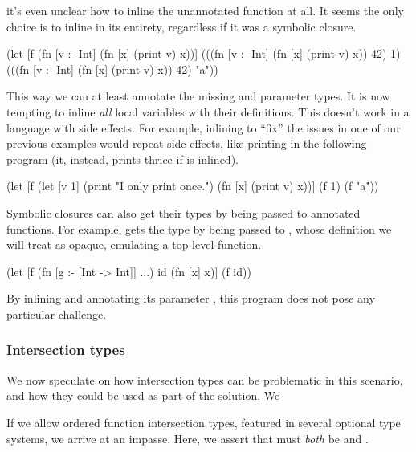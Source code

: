 it's even unclear how to inline the
unannotated function at all.
It seems the only choice is to inline 
in its entirety, regardless if it was a symbolic closure.

\begin{cljlisting}
(let [f (fn [v :- Int]
          (fn [x] (print v) x))]
  (((fn [v :- Int]
      (fn [x] (print v) x))
    42)
   1)
  (((fn [v :- Int]
      (fn [x] (print v) x))
    42)
   "a"))
\end{cljlisting}

This way we can at least annotate the missing  and 
parameter types.
It is now tempting to inline \emph{all} local variables with their
definitions.
This doesn't work in a language with side effects.
For example, inlining  to ``fix'' the issues
in one of our previous examples would repeat side
effects, like printing  in the following
program (it, instead, prints thrice if  is inlined).

\begin{cljlisting}
(let [f (let [v 1]
          (print "I only print once.")
          (fn [x] (print v) x))]
  (f 1)
  (f "a"))
\end{cljlisting}

Symbolic closures can also get their types by being passed
to annotated functions.
For example, 
gets the type 
by being passed to , whose definition we will treat
as opaque, emulating a top-level function.

\begin{cljlisting}
(let [f (fn [g :- [Int -> Int]] ...)
      id (fn [x] x)]
  (f id))
\end{cljlisting}

By inlining  and annotating its parameter ,
this program does not pose any particular challenge.

\subsubsection{Intersection types}

We now speculate on how intersection types can be
problematic in this scenario, and how they could
be used as part of the solution.
We 

If we allow ordered function intersection types,
featured in several optional type systems,
we arrive at an impasse.
Here, we assert that  must \emph{both}
be
and
.

